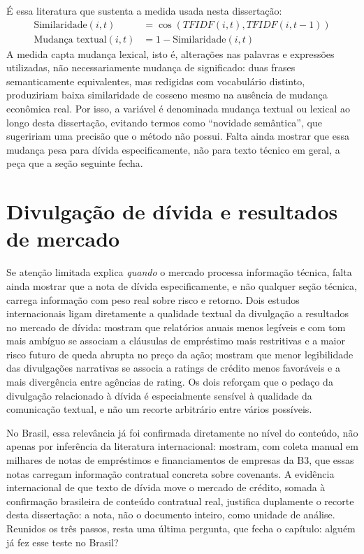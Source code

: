 \documentclass[a4paper,12pt]{report}
\begin{document}
É essa literatura que sustenta a medida usada nesta dissertação:
\begin{align}
    \text{Similaridade}(i,t) &= \cos\left(\mathit{TFIDF}(i,t), \mathit{TFIDF}(i,t-1)\right) \\
    \text{Mudança textual}(i,t) &= 1 - \text{Similaridade}(i,t)
\end{align}
A medida capta mudança lexical, isto é, alterações nas palavras e expressões utilizadas, não necessariamente mudança de significado: duas frases semanticamente equivalentes, mas redigidas com vocabulário distinto, produziriam baixa similaridade de cosseno mesmo na ausência de mudança econômica real. Por isso, a variável é denominada mudança textual ou lexical ao longo desta dissertação, evitando termos como ``novidade semântica'', que sugeririam uma precisão que o método não possui. Falta ainda mostrar que essa mudança pesa para dívida especificamente, não para texto técnico em geral, a peça que a seção seguinte fecha.

\section{Divulgação de dívida e resultados de mercado}
\label{sec:divida_credito}

Se atenção limitada explica \emph{quando} o mercado processa informação técnica, falta ainda mostrar que a nota de dívida especificamente, e não qualquer seção técnica, carrega informação com peso real sobre risco e retorno. Dois estudos internacionais ligam diretamente a qualidade textual da divulgação a resultados no mercado de dívida:  mostram que relatórios anuais menos legíveis e com tom mais ambíguo se associam a cláusulas de empréstimo mais restritivas e a maior risco futuro de queda abrupta no preço da ação;  mostram que menor legibilidade das divulgações narrativas se associa a ratings de crédito menos favoráveis e a mais divergência entre agências de rating. Os dois reforçam que o pedaço da divulgação relacionado à dívida é especialmente sensível à qualidade da comunicação textual, e não um recorte arbitrário entre vários possíveis.

No Brasil, essa relevância já foi confirmada diretamente no nível do conteúdo, não apenas por inferência da literatura internacional:  mostram, com coleta manual em milhares de notas de empréstimos e financiamentos de empresas da B3, que essas notas carregam informação contratual concreta sobre covenants. A evidência internacional de que texto de dívida move o mercado de crédito, somada à confirmação brasileira de conteúdo contratual real, justifica duplamente o recorte desta dissertação: a nota, não o documento inteiro, como unidade de análise. Reunidos os três passos, resta uma última pergunta, que fecha o capítulo: alguém já fez esse teste no Brasil?
\end{document}
